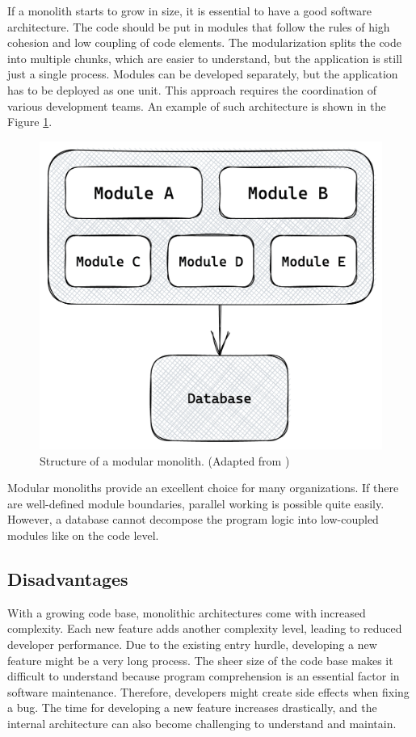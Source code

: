 \noindent If a monolith starts to grow in size, it is essential to have a good software architecture. The code should be put in modules that follow the rules of high cohesion and low coupling of code elements. The modularization splits the code into multiple chunks, which are easier to understand, but the application is still just a single process. Modules can be developed separately, but the application has to be deployed as one unit. This approach requires the coordination of various development teams. \cite[12-13]{book:2018:richardson:background:bff:microservices-patterns} \cite[12-13]{book:2019:newman:background:monolith:monolith-to-microservices} An example of such architecture is shown in the Figure \ref{fig:background:monolith:module-monolith-sketch}.

\ifshowImages
\begin{figure}[H]
    \centering
    \includegraphics[width=0.4\linewidth]{images/background/monolith/modular-monolith-sketch.png}
    \caption{Structure of a modular monolith. (Adapted from \cite[13]{book:2019:newman:background:monolith:monolith-to-microservices})}\label{fig:background:monolith:module-monolith-sketch}
\end{figure}
\fi

\noindent Modular monoliths provide an excellent choice for many organizations. If there are well-defined module boundaries, parallel working is possible quite easily. However, a database cannot decompose the program logic into low-coupled modules like on the code level. \cite[12-13]{book:2019:newman:background:monolith:monolith-to-microservices}

\subsection{Disadvantages}\label{subsection:background:software-monolith:disadvantages}

With a growing code base, monolithic architectures come with increased complexity. Each new feature adds another complexity level, leading to reduced developer performance. Due to the existing entry hurdle, developing a new feature might be a very long process. The sheer size of the code base makes it difficult to understand because program comprehension is an essential factor in software maintenance. \cite{article:1995:mayrhauser:background:monoliths:program-comprehension-during-software-maintenance-and-evolution} Therefore, developers might create side effects when fixing a bug. The time for developing a new feature increases drastically, and the internal architecture can also become challenging to understand and maintain. \cite[4-6]{book:2018:richardson:background:bff:microservices-patterns}

